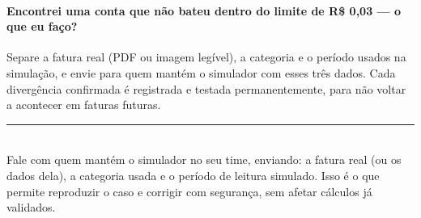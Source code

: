 \documentclass[11pt,a4paper]{article}
\begin{document}
\paragraph{Encontrei uma conta que não bateu dentro do limite de R\$ 0,03 --- o que eu faço?}
Separe a fatura real (PDF ou imagem legível), a categoria e o período usados na simulação, e envie para quem mantém o simulador com esses três dados. Cada divergência confirmada é registrada e testada permanentemente, para não voltar a acontecer em faturas futuras.

\vspace{16pt}
\begin{center}\color{linha}\rule{0.9\textwidth}{0.4pt}\end{center}
\vspace{6pt}

\\
Fale com quem mantém o simulador no seu time, enviando: a fatura real (ou os dados dela), a categoria usada e o período de leitura simulado. Isso é o que permite reproduzir o caso e corrigir com segurança, sem afetar cálculos já validados.

\vspace{4pt}
\end{document}

